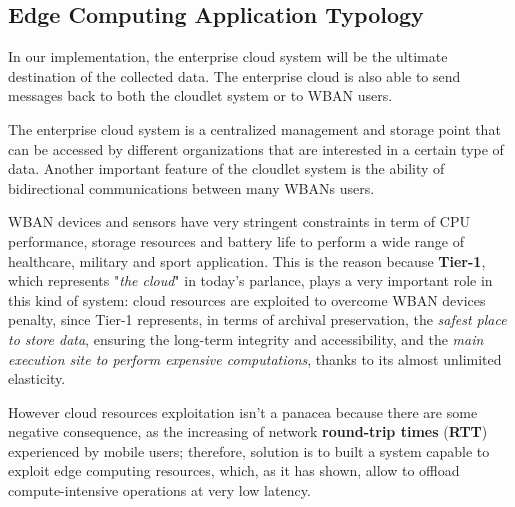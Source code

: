 \documentclass[sigchi]{acmart}
\begin{document}
\subsection{Edge Computing Application Typology}

\vspace{0.3cm}

\begin{quoting}[font=itshape, begintext={``}, endtext={''\cite[par.~3.2]{MSAReport}}]
In our implementation, the enterprise cloud system will be the ultimate destination of the collected data. The enterprise cloud is also able to send messages back to both the cloudlet system or to WBAN users.
\end{quoting}

\vspace{0.3cm}

\begin{quoting}[font=itshape, begintext={``}, endtext={''\cite[par.~4.1]{MSAReport}}]
The enterprise cloud system is a centralized management and storage point that can be accessed by different organizations that are interested in a certain type of data. Another important feature of the cloudlet system is the ability of bidirectional communications between many WBANs users.
\end{quoting}

\vspace{0.3cm}

WBAN devices and sensors have very stringent constraints in term of CPU performance, storage resources and battery life to perform a wide range of healthcare, military and sport application. This is the reason because \textbf{Tier-1}, which represents "\textit{the cloud}" in today's parlance, plays a very important role in this kind of system: cloud resources are exploited to overcome WBAN devices penalty, since Tier-1 represents, in terms of archival preservation, the \textit{safest place to store data}, ensuring the long-term integrity and accessibility, and the \textit{main execution site to perform expensive computations}, thanks to its almost unlimited elasticity. 

However cloud resources exploitation isn't a panacea because there are some negative consequence, as the increasing of network \textbf{round-trip times} (\textbf{RTT}) experienced by mobile users; therefore, \citet{MSAReport} solution is to built a system capable to exploit edge computing resources, which, as it has shown, allow to offload compute-intensive operations at very low latency.\cite{TheSeminalRoleEdgeNativeApplications}\cite{TheEmergenceOfEdgeComputing}
\end{document}
